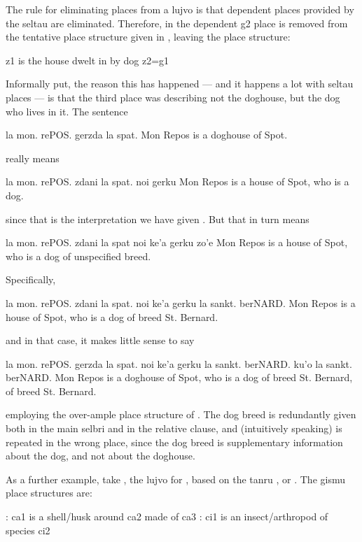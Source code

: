 The rule for eliminating places from a lujvo is that
    dependent places provided by the seltau are eliminated.
    Therefore, in  the dependent g2 place is removed from
    the tentative place structure given in , leaving the place structure:
\begin{example}
z1 is the house dwelt in by dog z2=g1
\end{example}

Informally put, the reason this has happened --- and it
    happens a lot with seltau places --- is that the third place
    was describing not the doghouse, but the dog who lives in it.
    The sentence
\begin{example}
la mon. rePOS. gerzda la spat.\n
Mon Repos is a doghouse of Spot.
\end{example}

{\noindent}really means
\begin{example}
la mon. rePOS. zdani la spat. noi gerku\n
Mon Repos is a house of Spot, who is a dog.
\end{example}

{\noindent}since that is the interpretation we have given . But
    that in turn means
\begin{example}
la mon. rePOS. zdani la spat noi ke'a gerku zo'e\n
Mon Repos is a house of Spot, who is a dog\n
\T	of unspecified breed.
\end{example}

Specifically,
\begin{example}
la mon. rePOS. zdani la spat.\n
\T	noi ke'a gerku la sankt. berNARD.\n
Mon Repos is a house of Spot,\n
\T	who is a dog of breed St. Bernard.
\end{example}

{\noindent}and in that case, it makes little sense to say
\begin{example}
la mon. rePOS. gerzda la spat.\n
\T	noi ke'a gerku la sankt. berNARD. ku'o\n
\T	la sankt. berNARD.\n
Mon Repos is a doghouse of Spot,\n
\T	who is a dog of breed St. Bernard,\n
\T	of breed St. Bernard.
\end{example}

{\noindent}employing the over-ample place structure of . The dog breed is redundantly
    given both in the main selbri and in the relative clause, and
    (intuitively speaking) is repeated in the wrong place, since
    the dog breed is supplementary information about the dog, and
    not about the doghouse. 

As a further example, take , the lujvo for
    , based on the tanru , or
    . The gismu place structures are:
\begin{example}
: ca1 is a shell/husk around ca2 made of ca3\n
{}: ci1 is an insect/arthropod of species ci2
\end{example}

